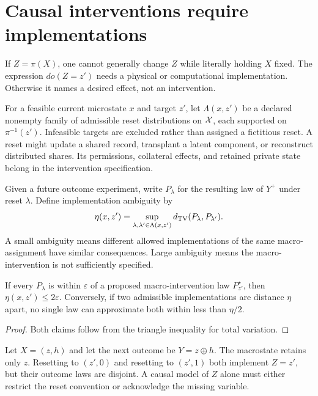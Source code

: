 \section{Causal interventions require implementations}\label{MS:sec:causal}
If $Z=\pi(X)$, one cannot generally change $Z$ while literally holding $X$ fixed. The expression $do(Z=z')$ needs a physical or computational implementation. Otherwise it names a desired effect, not an intervention.

For a feasible current microstate $x$ and target $z'$, let $\Lambda(x,z')$ be a declared nonempty family of admissible reset distributions on $\mathcal X$, each supported on $\pi^{-1}(z')$. Infeasible targets are excluded rather than assigned a fictitious reset. A reset might update a shared record, transplant a latent component, or reconstruct distributed shares. Its permissions, collateral effects, and retained private state belong in the intervention specification.

Given a future outcome experiment, write $P_\lambda$ for the resulting law of $Y^+$ under reset $\lambda$. Define implementation ambiguity by
\[
\eta(x,z')=\sup_{\lambda,\lambda'\in\Lambda(x,z')}
d_{\mathrm{TV}}(P_\lambda,P_{\lambda'}).
\]
A small ambiguity means different allowed implementations of the same macro-assignment have similar consequences. Large ambiguity means the macro-intervention is not sufficiently specified.

\begin{MSproposition}\label{MS:prop:lift}
If every $P_\lambda$ is within $\varepsilon$ of a proposed macro-intervention law $P^\star_{z'}$, then $\eta(x,z')\leq2\varepsilon$. Conversely, if two admissible implementations are distance $\eta$ apart, no single law can approximate both within less than $\eta/2$.
\end{MSproposition}
\begin{proof}
Both claims follow from the triangle inequality for total variation.
\end{proof}

\begin{MSexample}
Let $X=(z,h)$ and let the next outcome be $Y=z\oplus h$. The macrostate retains only $z$. Resetting to $(z',0)$ and resetting to $(z',1)$ both implement $Z=z'$, but their outcome laws are disjoint. A causal model of $Z$ alone must either restrict the reset convention or acknowledge the missing variable.
\end{MSexample}

